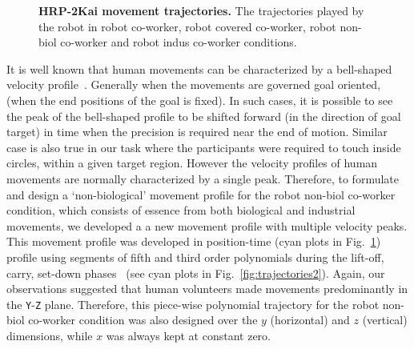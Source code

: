  
\begin{figure}[hpt]
	\caption{{\bf HRP-2Kai movement trajectories.} The trajectories played by the robot in robot co-worker, robot covered co-worker, robot non-biol co-worker and robot indus co-worker conditions.}
	\label{fig:trajectories}
\end{figure}


It is well known that human movements can be characterized by a bell-shaped velocity profile~\cite{flash1985coordination}. Generally when the movements are governed goal oriented, (when the end positions of the goal is fixed). In such cases, it is possible to see the peak of the bell-shaped profile to be shifted forward (in the direction of goal target) in time when the precision is required near the end of motion. Similar case is also true in our task where the participants were required to touch inside circles, within a given target region. However the velocity profiles of human movements are normally characterized by a single peak. Therefore, to formulate and design a `non-biological' movement profile for the robot non-biol co-worker condition, which consists of essence from both biological and industrial movements, we developed a a new movement profile with multiple velocity peaks. This movement profile was developed in position-time (cyan plots in Fig.~\ref{fig:trajectories}) profile using segments of fifth and third order polynomials during the lift-off, carry, set-down phases~\cite{Biagiotti:Springer:2008} (see cyan plots in Fig.~\ref{fig:trajectories2}). Again, our observations suggested that human volunteers made movements predominantly in the \texttt{Y}-\texttt{Z} plane. Therefore, this piece-wise polynomial trajectory for the robot non-biol co-worker condition was also designed over the $y$ (horizontal) and $z$ (vertical) dimensions, while $x$ was always kept at constant zero.



